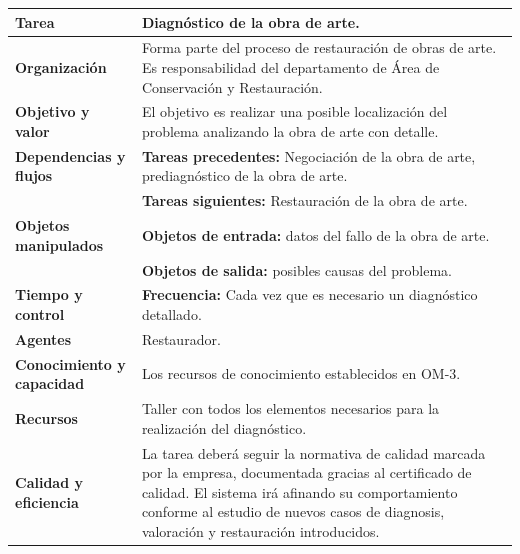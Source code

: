 \documentclass[a4paper,11pt]{article}
\begin{document}
			\newpage
			\begin{center}
				\begin{tabular}{| l | p{6.5cm} |}
					\hline
					\cellcolor[RGB]{224,233,250}\textbf{Tarea} & Diagnóstico de la obra de
					arte.\\
					\hline
					\cellcolor[RGB]{224,233,250}\textbf{Organización} & Forma parte del proceso
					de restauración de obras de arte. Es responsabilidad del departamento de Área de Conservación y
					Restauración.\\
					\hline
					\cellcolor[RGB]{224,233,250}\textbf{Objetivo y valor} & El objetivo es
					realizar una posible localización del problema analizando la obra de arte con detalle.\\
					\hline
					\cellcolor[RGB]{224,233,250}\textbf{Dependencias y flujos} & \textbf{Tareas
					precedentes:} Negociación de la obra de arte, prediagnóstico de la obra de arte.\\
					\cellcolor[RGB]{224,233,250}& \textbf{Tareas siguientes:} Restauración de
					la obra de arte.\\
					\hline
					\cellcolor[RGB]{224,233,250}\textbf{Objetos manipulados} & \textbf{Objetos
					de entrada:} datos del fallo de la obra de arte.\\
					\cellcolor[RGB]{224,233,250}& \textbf{Objetos de salida:} posibles causas
					del problema.\\
					\hline
					\cellcolor[RGB]{224,233,250}\textbf{Tiempo y control} &
					\textbf{Frecuencia:} Cada vez que es necesario un diagnóstico detallado.\\
					\hline
					\cellcolor[RGB]{224,233,250}\textbf{Agentes} & Restaurador.\\
					\hline
					\cellcolor[RGB]{224,233,250}\textbf{Conocimiento y capacidad} & Los
					recursos de conocimiento establecidos en OM-3.\\
					\hline
					\cellcolor[RGB]{224,233,250}\textbf{Recursos} & Taller con todos los
					elementos necesarios para la realización del diagnóstico.\\
					\hline
					\cellcolor[RGB]{224,233,250}\textbf{Calidad y eficiencia} & La tarea deberá
					seguir la normativa de calidad marcada por la empresa, documentada gracias al certificado de calidad. El sistema irá afinando su comportamiento conforme al estudio de nuevos casos de diagnosis, valoración y restauración introducidos.\\
					\hline
				\end{tabular}
			\end{center}
\end{document}
